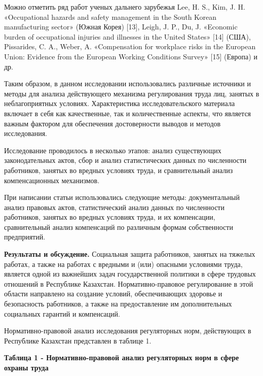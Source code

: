 Можно отметить ряд работ ученых дальнего зарубежья Lee, H. S., Kim, J.
H. «Occupational hazards and safety management in the South Korean
manufacturing sector» (Южная Корея) {[}13{]}, Leigh, J. P., Du, J.
«Economic burden of occupational injuries and illnesses in the United
States» {[}14{]} (США), Pissarides, C. A., Weber, A. «Compensation for
workplace risks in the European Union: Evidence from the European
Working Conditions Survey» {[}15{]} (Европа) и др.

Таким образом, в данном исследовании использовались различные источники
и методы для анализа действующего механизма регулирования труда лиц,
занятых в неблагоприятных условиях. Характеристика исследовательского
материала включает в себя как качественные, так и количественные
аспекты, что является важным фактором для обеспечения достоверности
выводов и методов исследования.

Исследование проводилось в несколько этапов: анализ существующих
законодательных актов, сбор и анализ статистических данных по
численности работников, занятых во вредных условиях труда, и
сравнительный анализ компенсационных механизмов.

При написании статьи использовались следующие методы: документальный
анализ правовых актов, статистический анализ данных по численности
работников, занятых во вредных условиях труда, и их компенсации,
сравнительный анализ компенсаций по различным формам собственности
предприятий.

{\bfseries Результаты и обсуждение.} Социальная защита работников, занятых
на тяжелых работах, а также на работах с вредными и (или) опасными
условиями труда, является одной из важнейших задач государственной
политики в сфере трудовых отношений в Республике Казахстан.
Нормативно-правовое регулирование в этой области направлено на создание
условий, обеспечивающих здоровье и безопасность работников, а также на
предоставление им дополнительных социальных гарантий и компенсаций.

Нормативно-правовой анализ исследования регуляторных норм, действующих в
Республике Казахстан представлен в таблице 1.

{\bfseries Таблица 1 - Нормативно-правовой анализ регуляторных норм в сфере
охраны труда}

